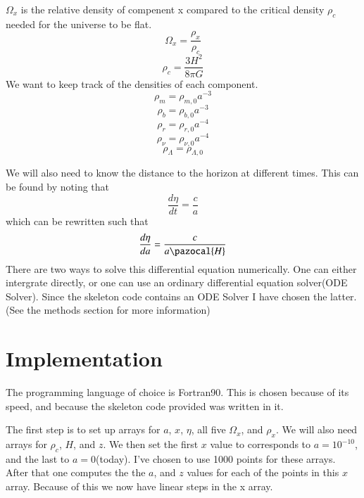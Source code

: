\documentclass{aa}   %
\begin{document}
$\Omega_x$ is the relative density of compenent x compared to the critical density $\rho_c$ needed for the universe to be flat.
\begin{equation}
 \Omega_x = \frac{\rho_x}{\rho_c}
\end{equation}
\begin{equation}
 \rho_c = \frac{3H^2}{8\pi G}
\end{equation}
We want to keep track of the densities of each component.
\begin{equation}
 \rho_m = \rho_{m,0}a^{-3}
\end{equation}
\begin{equation}
 \rho_b = \rho_{b,0}a^{-3}
\end{equation}
\begin{equation}
 \rho_r = \rho_{r,0}a^{-4}
\end{equation}
\begin{equation}
 \rho_\nu = \rho_{\nu,0}a^{-4}
\end{equation}
\begin{equation}
 \rho_\Lambda = \rho_{\Lambda,0}
\end{equation}

We will also need to know the distance to the horizon at different times. This can be found by noting that
\begin{equation*}
 \frac{d\eta}{dt} = \frac{c}{a}
\end{equation*}
which can be rewritten such that
\begin{equation}\label{eta}
 \frac{d\eta}{da} = \frac{c}{a \pazocal{H}}
\end{equation}
There are two ways to solve this differential equation numerically. One can either intergrate directly, or one can use an ordinary differential equation solver(ODE Solver). Since the skeleton code contains an ODE Solver I have chosen the latter. (See the methods section for more information)

\section{Implementation}\label{sec:Imp}
The programming language of choice is Fortran90. This is chosen because of its speed, and because the skeleton code provided was written in it. 

The first step is to set up arrays for $a$, $x$, $\eta$, all five $\Omega_x$, and $\rho_x$. We will also need arrays for $\rho_c$, $H$, and $z$.
We then set the first $x$ value to corresponds to $a= 10^{-10}$, and the last to $a=0$(today). 
I've chosen to use 1000 points for these arrays. After that one computes the the $a$, and $z$ values for each of the points in this $x$ array. Because of this we now have linear steps in the x array. 
\end{document}
